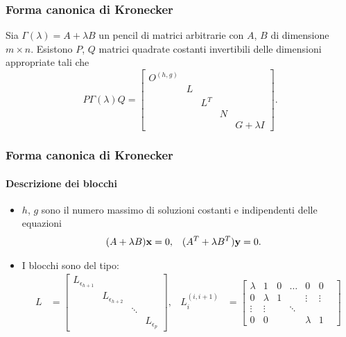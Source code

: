 \begin{frame}
	\frametitle{Forma canonica di Kronecker}
	\begin{theorem}
		Sia \(\Gamma(\lambda) = A + \lambda B\) un pencil di matrici arbitrarie con
		$A$, $B$ di dimensione \(m \times n\). Esistono $P$, $Q$
		matrici quadrate costanti invertibili delle dimensioni appropriate tali che
		\[
			P\Gamma(\lambda)Q = \begin{bmatrix}
				O^{(h, g)} \\
				& L \\
				&& L^T \\
				&&& N \\
				&&&& G+\lambda I
			\end{bmatrix}.
		\]
	\end{theorem}
\end{frame}


\begin{frame}
	\frametitle{Forma canonica di Kronecker}
	\framesubtitle{Descrizione dei blocchi}
	\begin{itemize}
		\item $h$, $g$ sono il numero massimo di soluzioni costanti e indipendenti delle
		equazioni
		\begin{align*}
			(A + \lambda B)\vb{x} &= 0, & (A^T + \lambda B^T)\vb{y} &= 0.
		\end{align*}
		\item {} I blocchi sono del tipo:
		\begin{align*}
			L &= \left[\begin{smallmatrix}
				L_{\epsilon_{h+1}} \\
				& L_{\epsilon_{h+2}} \\
				& & \ddots \\
				& & & L_{\epsilon_{p}}
			\end{smallmatrix}\right], &
			L_{i}^{(i, i+1)} &= \left[\begin{smallmatrix}
				\lambda        &      1     &       0      &     \ldots       &    0       &    0   \\
				0              & \lambda    &       1      &                  & \vdots     & \vdots \\
				\vdots         & \vdots     &     & \ddots    &      &            &        \\
				0              &      0     &              &                  & \lambda    &    1   
			\end{smallmatrix}\right]
		\end{align*}
	\end{itemize}
\end{frame}


